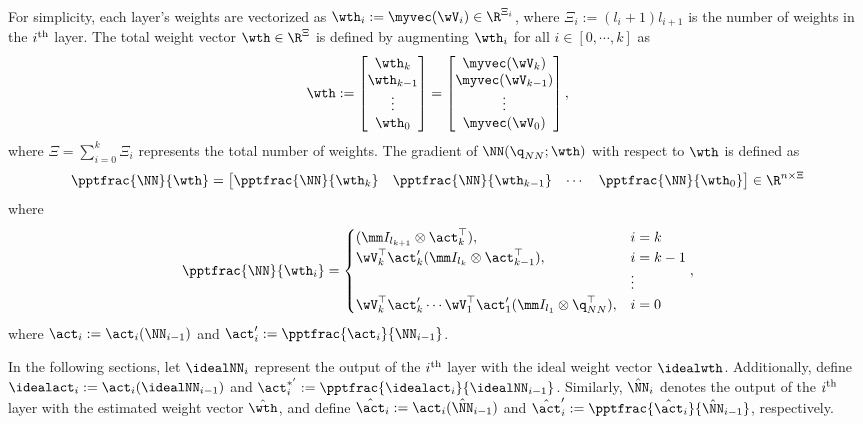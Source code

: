 \documentclass[lettersize,journal]{IEEEtran}
\begin{document}
For simplicity, each layer's weights are vectorized as $\wth_i:=\myvec(\wV_i)\in\R^{\Xi_i}$, where $\Xi_i:= (l_i+1)l_{i+1}$ is the number of weights in the $i\textsuperscript{th}$ layer. 
The total weight vector $\wth\in\R^{\Xi}$ is defined by augmenting $\wth_i$ for all $i\in [0,\cdots,k]$ as 
\begin{equation}
    \wth := 
    \begin{bmatrix}
        \wth_k\\
        \wth_{k-1}\\
        \vdots\\
        \wth_0
    \end{bmatrix}
    =
    \begin{bmatrix}
        \myvec(\wV_k)\\
        \myvec(\wV_{k-1})\\
        \vdots\\
        \myvec(\wV_0)
    \end{bmatrix},
\end{equation}
where $\Xi={\sum_{i=0}^{k} \Xi_i}$ represents the total number of weights. The gradient of $ \NN(\q_{NN};\wth)$ with respect to $\wth$ is defined as
\begin{equation}
    \pptfrac{\NN}{\wth}=
    \begin{bmatrix}
        \pptfrac{\NN}{\wth_k}&
        \pptfrac{\NN}{\wth_{k-1}}&
    \cdots &
        \pptfrac{\NN}{\wth_0}
    \end{bmatrix}
    \in\R^{n \times \Xi}
    \label{eq. nabla phi}
\end{equation}
where
\begin{equation}
    \pptfrac{\NN}{\wth_i} = 
    \begin{cases}
        (\mm I_{l_{k+1}}\otimes \act_{k}^\top  ), 
        &
        i=k 
        \\
        \wV_k^\top   \act_{k}' (\mm I_{l_{k}}\otimes  \act_{k-1}^\top  ), 
        & 
        i=k-1
        \\
        &
        \vdots 
        \\
        \wV_k^\top   \act'_{k} \cdots \wV_1^\top  \act_1' (\mm I_{l_1}\otimes \q_{NN}^\top  ), 
        &
        i = 0
    \end{cases},
    \label{eq:NN:grad}
\end{equation}
where $\act_i:= \act_i(\NN_{i-1})$ and $\act_i':= \pptfrac{\act_i}{\NN_{i-1}}$.

In the following sections, let $\idealNN_i$ represent the output of the $i\textsuperscript{th}$ layer with the ideal weight vector $\idealwth$. 
Additionally, define $\idealact_i:=\act_i(\idealNN_{i-1})$ and $\act^{*'}_i:= \pptfrac{\idealact_i}{\idealNN_{i-1}}$. 
Similarly, $\hat\NN_i$ denotes the output of the $i\textsuperscript{th}$ layer with the estimated weight vector $\hat \wth$, and define $\hat\act_i:=\act_i(\hat\NN_{i-1})$ and $\hat\act_i':= \pptfrac{\hat\act_i}{\hat\NN_{i-1}}$, respectively.
\end{document}
